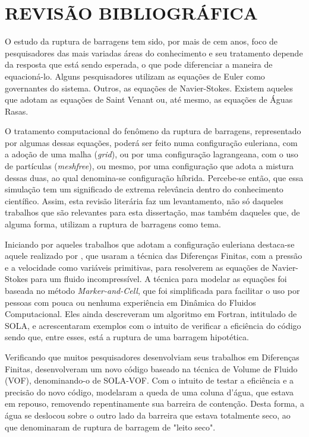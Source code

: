 \chapter{REVISÃO BIBLIOGRÁFICA}

O estudo da ruptura de barragens tem sido, por mais de cem anos, foco de pesquisadores das mais variadas áreas do conhecimento e seu tratamento depende da resposta que está sendo esperada, o que pode diferenciar a maneira de equacioná-lo. Alguns pesquisadores utilizam as equações de Euler como governantes do sistema. Outros, as equações de Navier-Stokes. Existem aqueles que adotam as equações de Saint Venant ou, até mesmo, as equações de Águas Rasas. 

O tratamento computacional do fenômeno da ruptura de barragens, representado por algumas dessas equações, poderá ser feito numa configuração euleriana, com a adoção de uma malha (\textit{grid}), ou por uma configuração lagrangeana, com o uso de partículas (\textit{meshfree}), ou mesmo, por uma configuração que adota a mistura dessas duas, ao qual denomina-se configuração híbrida. Percebe-se então, que essa simulação tem um significado de extrema relevância dentro do conhecimento científico. Assim, esta revisão literária faz um levantamento, não só daqueles trabalhos que são relevantes para esta dissertação, mas também daqueles que, de alguma forma, utilizam a ruptura de barragens como tema.

Iniciando por aqueles trabalhos que adotam a configuração euleriana destaca-se aquele realizado por , que usaram a técnica das Diferenças Finitas, com a pressão e a velocidade como variáveis primitivas, para resolverem as equações de Navier-Stokes para um fluido incompressível. A técnica para modelar as equações foi baseada no método \textit{Marker-and-Cell}, que foi simplificada para facilitar o uso por pessoas com pouca ou nenhuma experiência em Dinâmica do Fluidos Computacional. Eles ainda descreveram um algoritmo em Fortran, intitulado de SOLA, e acrescentaram exemplos com o intuito de verificar a eficiência do código sendo que, entre esses, está a ruptura de uma barragem hipotética.

Verificando que muitos pesquisadores desenvolviam seus trabalhos em Diferenças Finitas,  desenvolveram um novo código baseado na técnica de Volume de Fluido (VOF), denominando-o de SOLA-VOF. Com o intuito de testar a eficiência e a precisão do novo código, modelaram a queda de uma coluna d'água, que estava em repouso, removendo repentinamente sua barreira de contenção. Desta forma, a água se deslocou sobre o outro lado da barreira que estava totalmente seco, ao que denominaram de ruptura de barragem de "leito seco". 

